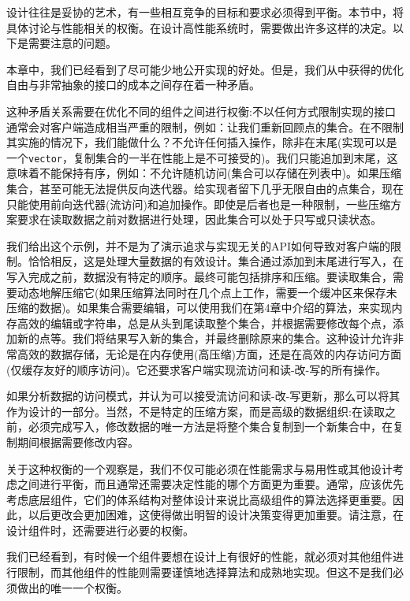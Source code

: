 
设计往往是妥协的艺术，有一些相互竞争的目标和要求必须得到平衡。本节中，将具体讨论与性能相关的权衡。在设计高性能系统时，需要做出许多这样的决定。以下是需要注意的问题。


本章中，我们已经看到了尽可能少地公开实现的好处。但是，我们从中获得的优化自由与非常抽象的接口的成本之间存在着一种矛盾。 

这种矛盾关系需要在优化不同的组件之间进行权衡:不以任何方式限制实现的接口通常会对客户端造成相当严重的限制，例如：让我们重新回顾点的集合。在不限制其实施的情况下，我们能做什么？不允许任何插入操作，除非在末尾(实现可以是一个\texttt{vector}，复制集合的一半在性能上是不可接受的)。我们只能追加到末尾，这意味着不能保持有序，例如：不允许随机访问(集合可以存储在列表中)。如果压缩集合，甚至可能无法提供反向迭代器。给实现者留下几乎无限自由的点集合，现在只能使用前向迭代器(流访问)和追加操作。即使是后者也是一种限制，一些压缩方案要求在读取数据之前对数据进行处理，因此集合可以处于只写或只读状态。

我们给出这个示例，并不是为了演示追求与实现无关的API如何导致对客户端的限制。恰恰相反，这是处理大量数据的有效设计。集合通过添加到末尾进行写入，在写入完成之前，数据没有特定的顺序。最终可能包括排序和压缩。要读取集合，需要动态地解压缩它(如果压缩算法同时在几个点上工作，需要一个缓冲区来保存未压缩的数据)。如果集合需要编辑，可以使用我们在第4章中介绍的算法，来实现内存高效的编辑或字符串，总是从头到尾读取整个集合，并根据需要修改每个点，添加新的点等。我们将结果写入新的集合，并最终删除原来的集合。这种设计允许非常高效的数据存储，无论是在内存使用(高压缩)方面，还是在高效的内存访问方面(仅缓存友好的顺序访问)。它还要求客户端实现流访问和读-改-写的所有操作。 

如果分析数据的访问模式，并认为可以接受流访问和读-改-写更新，那么可以将其作为设计的一部分。当然，不是特定的压缩方案，而是高级的数据组织:在读取之前，必须完成写入，修改数据的唯一方法是将整个集合复制到一个新集合中，在复制期间根据需要修改内容。 

关于这种权衡的一个观察是，我们不仅可能必须在性能需求与易用性或其他设计考虑之间进行平衡，而且通常还需要决定性能的哪个方面更为重要。通常，应该优先考虑底层组件，它们的体系结构对整体设计来说比高级组件的算法选择更重要。因此，以后更改会更加困难，这使得做出明智的设计决策变得更加重要。请注意，在设计组件时，还需要进行必要的权衡。 


我们已经看到，有时候一个组件要想在设计上有很好的性能，就必须对其他组件进行限制，而其他组件的性能则需要谨慎地选择算法和成熟地实现。但这不是我们必须做出的唯一一个权衡。 

